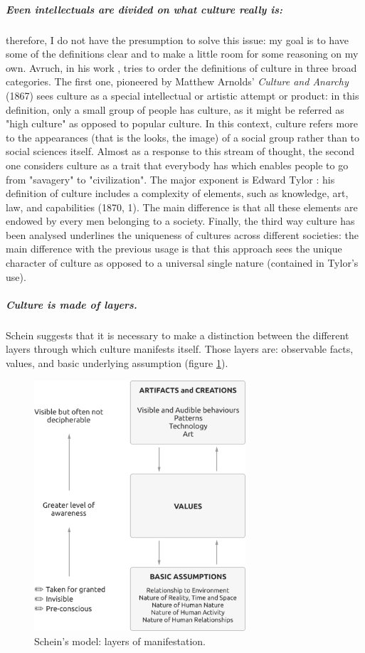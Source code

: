 \documentclass[../main.tex]{subfiles}
\begin{document}
\subparagraph{Even intellectuals are divided on what culture really is:} therefore, I do not have the presumption to solve this issue: my goal is to have some of the definitions clear and to make a little room for some reasoning on my own. Avruch, in his work \cite{avruch}, tries to order the definitions of culture in three broad categories. The first one, pioneered by Matthew Arnolds' \textit{Culture and Anarchy} (1867) sees culture as a special intellectual or artistic attempt or product: in this definition, only a small group of people has culture, as it might be referred as "high culture" as opposed to popular culture. In this context, culture refers more to the appearances (that is the looks, the image) of a social group rather than to social sciences itself. Almost as a response to this stream of thought, the second one considers culture as a trait that everybody has which enables people to go from "savagery" to "civilization". The major exponent is Edward Tylor \cite{tylor}: his definition of culture includes a complexity of elements, such as knowledge, art, law, and capabilities (1870, 1). The main difference is that all these elements are endowed by every men belonging to a society. Finally, the third way culture has been analysed underlines the uniqueness of cultures across different societies: the main difference with the previous usage is that this approach sees the unique character of culture as opposed to a universal single nature (contained in Tylor's use).

\subparagraph*{Culture is made of layers.} Schein %
suggests that it is necessary to make a distinction between the different layers through which culture manifests itself. Those layers are: observable facts, values, and basic underlying assumption (figure \ref{schein}).
\begin{figure}[h]
    \centering\includegraphics[width=0.7\textwidth]{images/values}
    \caption{Schein's model: layers of manifestation.} %
    \label{schein}
\end{figure}
\end{document}
